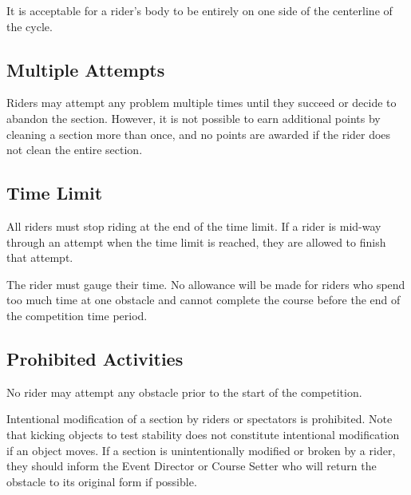 It is acceptable for a rider's body to be entirely on one side of the centerline of the cycle.

\subsection{Multiple Attempts}
Riders may attempt any problem multiple times until they succeed or decide to abandon the section.
However, it is not possible to earn additional points by cleaning a section more than once, and no points are awarded if the rider does not clean the entire section.

\subsection{Time Limit}

All riders must stop riding at the end of the time limit. 
If a rider is mid-way through an attempt when the time limit is reached, they are allowed to finish that attempt.

The rider must gauge their time. 
No allowance will be made for riders who spend too much time at one obstacle and cannot complete the course before the end of the competition time period.

\subsection{Prohibited Activities}
No rider may attempt any obstacle prior to the start of the competition. 

Intentional modification of a section by riders or spectators is prohibited. 
Note that kicking objects to test stability does not constitute intentional modification if an object moves. 
If a section is unintentionally modified or broken by a rider, they should inform the Event Director or Course Setter who will return the obstacle to its original form if possible.
